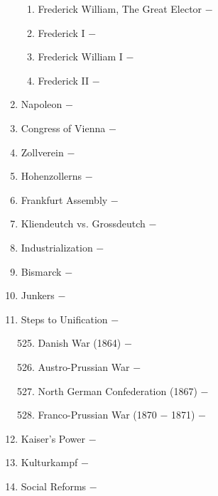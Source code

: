 \documentclass[12pt]{article}
\begin{document}
\begin{enumerate}
\begin{enumerate}[label=\arabic{*}.]
\item Frederick William, The Great Elector $-$ 

\item Frederick I $-$ 

\item Frederick William I $-$ 

\item Frederick II $-$ 

\end{enumerate}
\setcounter{enumi}{514}

\item Napoleon $-$ 

\item Congress of Vienna $-$ 

\item Zollverein $-$ 

\item Hohenzollerns $-$ 

\item Frankfurt Assembly $-$ 

\item Kliendeutch vs. Grossdeutch $-$ 

\item Industrialization $-$ 

\item Bismarck $-$ 

\item Junkers $-$ 

\item Steps to Unification $-$ 

\begin{enumerate}[label=\arabic{*}.]
\setcounter{enumii}{524}

\item Danish War (1864) $-$ 

\item Austro-Prussian War $-$ 

\item North German Confederation (1867) $-$ 

\item Franco-Prussian War (1870 $-$ 1871) $-$ 

\end{enumerate}
\setcounter{enumi}{528}


\item Kaiser's Power $-$ 

\item Kulturkampf $-$ 

\item Social Reforms $-$ 


\end{enumerate}
\end{document}
